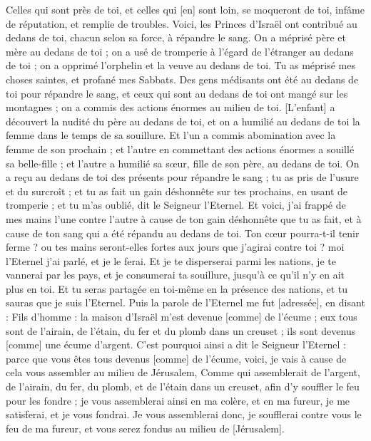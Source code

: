\begin{multicols}{2}
Celles qui sont près de toi, et celles qui [en] sont loin, se moqueront de toi, infâme de réputation, et remplie de troubles.
Voici, les Princes d'Israël ont contribué au dedans de toi, chacun selon sa force, à répandre le sang.
On a méprisé père et mère au dedans de toi ; on a usé de tromperie à l'égard de l'étranger au dedans de toi ; on a opprimé l'orphelin et la veuve au dedans de toi.
Tu as méprisé mes choses saintes, et profané mes Sabbats.
Des gens médisants ont été au dedans de toi pour répandre le sang, et ceux qui sont au dedans de toi ont mangé sur les montagnes ; on a commis des actions énormes au milieu de toi.
[L'enfant] a découvert la nudité du père au dedans de toi, et on a humilié au dedans de toi la femme dans le temps de sa souillure.
Et l'un a commis abomination avec la femme de son prochain ; et l'autre en commettant des actions énormes a souillé sa belle-fille ; et l'autre a humilié sa sœur, fille de son père, au dedans de toi.
On a reçu au dedans de toi des présents pour répandre le sang ; tu as pris de l'usure et du surcroît ; et tu as fait un gain déshonnête sur tes prochains, en usant de tromperie ; et tu m'as oublié, dit le Seigneur l'Eternel.
Et voici, j'ai frappé de mes mains l'une contre l'autre à cause de ton gain déshonnête que tu as fait, et à cause de ton sang qui a été répandu au dedans de toi.
Ton cœur pourra-t-il tenir ferme ? ou tes mains seront-elles fortes aux jours que j'agirai contre toi ? moi l'Eternel j'ai parlé, et je le ferai.
Et je te disperserai parmi les nations, je te vannerai par les pays, et je consumerai ta souillure, jusqu'à ce qu'il n'y en ait plus en toi.
Et tu seras partagée en toi-même en la présence des nations, et tu sauras que je suis l'Eternel.
Puis la parole de l'Eternel me fut [adressée], en disant :
Fils d'homme : la maison d'Israël m'est devenue [comme] de l'écume ; eux tous sont de l'airain, de l'étain, du fer et du plomb dans un creuset ; ils sont devenus [comme] une écume d'argent.
C'est pourquoi ainsi a dit le Seigneur l'Eternel : parce que vous êtes tous devenus [comme] de l'écume, voici, je vais à cause de cela vous assembler au milieu de Jérusalem,
Comme qui assemblerait de l'argent, de l'airain, du fer, du plomb, et de l'étain dans un creuset, afin d'y souffler le feu pour les fondre ; je vous assemblerai ainsi en ma colère, et en ma fureur, je me satisferai, et je vous fondrai.
Je vous assemblerai donc, je soufflerai contre vous le feu de ma fureur, et vous serez fondus au milieu de [Jérusalem].

\end{multicols}
